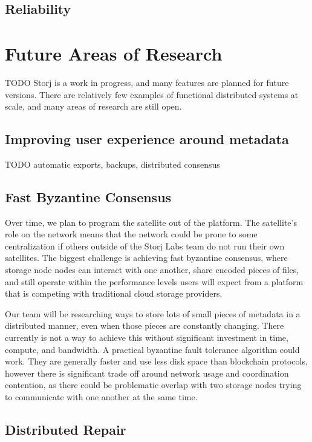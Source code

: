 \documentclass[11pt,fleqn,openany]{book}
\newcommand{\todo}[1]{{\color{red} TODO #1 }}
\begin{document}
\section{Reliability}

\chapter{Future Areas of Research}\label{sec:future_work}

\todo{ Storj is a work in progress, and many features are planned for future
versions. There are relatively few examples of functional distributed systems at
scale, and many areas of research are still open. }

\section{Improving user experience around metadata}

\todo{automatic exports, backups, distributed consensus}

\section{Fast Byzantine Consensus}

Over time, we plan to program the satellite out of the platform.
The satellite's role on the network means that the network could be prone
to some
centralization if others outside of the Storj Labs team do not run their own
satellites. The biggest challenge is achieving fast byzantine consensus,
where storage node nodes can interact with one another, share encoded pieces of
files,
and still operate within the performance levels users will expect from a
platform that is competing with traditional cloud storage providers.

Our team will be researching ways to store lots of small pieces of metadata
in a distributed manner, even when those pieces are constantly changing. There
currently is not a way to achieve this without significant investment in time,
compute, and bandwidth. A practical byzantine fault tolerance algorithm could
work. They are generally faster and use less disk space than blockchain
protocols, however there is significant trade off around network usage and
coordination contention, as there could be problematic overlap with two storage
nodes trying to communicate with one another at the same time.

\section{Distributed Repair}
\end{document}
